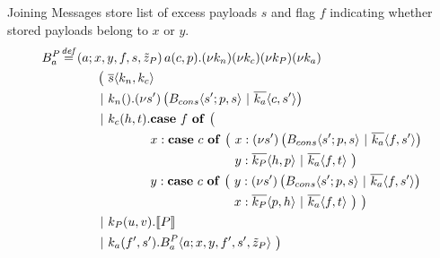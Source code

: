 \documentclass[]{beamer}
\begin{document}
    \begin{frame}{Joining Messages}
      store list of excess payloads $s$
      and flag $f$ indicating whether stored payloads belong to $x$ or $y$.
      \pause
      \begin{align*}
        \adef*{B_a^P}{a}{x,y,f,s,\tilde{z}_P}{\arcv{a}{c,p} . \anew{k_n}{\anew{k_c}{\anew{k_P}{\anew{k_a}{
          \\
          &\hspace{1cm}
          \begin{aligned}[t]
            \big(\ &\asnd{s}{k_n,k_c}
            \\
            \apar  &\arcv{k_n}{} . \anew{s'}{\parens{\ains{B_{cons}}{s'}{p, s} \apar \asnd{k_a}{c, s'}}}
            \\
            \apar  &\arcv{k_c}{h,t} .
              \begin{aligned}[t]
                &\acse*{f}{\big(\ 
                  \\
                  &\aalt{x}{
                    \begin{aligned}[t]
                      \acse*{c}{\big(\ 
                        &\aalt{x}{\anew*{s'}{
                          \ains{B_{cons}}{s'}{p,s} \apar \asnd{k_a}{f,s'}
                        }}\\
                        &\aalt{y}{
                          \asnd{k_P}{h,p} \apar \asnd{k_a}{f,t}
                        }\ 
                      \big)}
                    \end{aligned}
                  }\\
                  &\aalt{y}{
                    \begin{aligned}[t]
                      \acse*{c}{\big(\ 
                        &\aalt{y}{\anew*{s'}{
                          \ains{B_{cons}}{s'}{p,s} \apar \asnd{k_a}{f,s'}
                        }}\\
                        &\aalt{x}{
                          \asnd{k_P}{p,h} \apar \asnd{k_a}{f,t}
                        }\ 
                      \big)}
                      \ \big)
                    \end{aligned}
                  }\ 
                }
              \end{aligned}
            \\
            \apar  &\arcv{k_P}{u,v} . \encMJtoAP{P}
            \\
            \apar  &\arcv{k_a}{f',s'} . \ains{B_a^P}{a}{x, y, f', s',\tilde{z}_P}
            \ \big)
          \end{aligned}
        }}}}} \\
      \end{align*}
    \end{frame}
\end{document}
